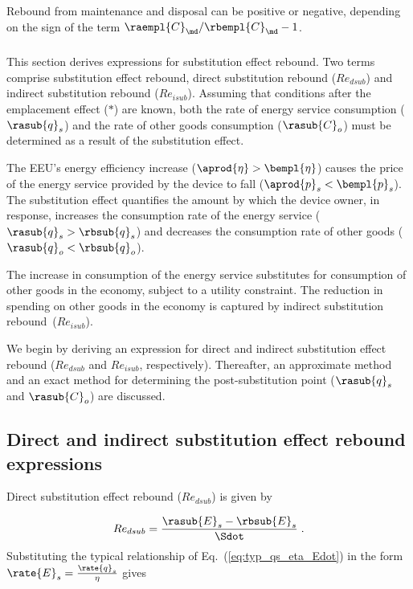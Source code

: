 Rebound from maintenance and disposal can be positive or negative,
depending on the sign of the term $\raempl{C}_{\md}/\rbempl{C}_{\md} - 1$.


\subsubsection{\Subeffect{}} 
\label{sec:Re_sub}

This section derives expressions for substitution effect rebound.
Two terms comprise substitution effect rebound,
direct substitution rebound ($Re_{dsub}$) and
indirect substitution rebound ($Re_{isub}$).
Assuming that conditions after the emplacement effect ($*$) are known, 
both the 
rate of energy service consumption ($\rasub{q}_s$) and
the rate of other goods consumption ($\rasub{C}_o$) 
must be determined as a result of the substitution effect.

The EEU's energy efficiency increase
($\aprod{\eta} > \bempl{\eta}$)
causes the price of the energy service provided by the device to fall
($\aprod{p}_s < \bempl{p}_s$).
The substitution effect quantifies the amount by which
the device owner, in response,
increases the consumption rate of the energy service ($\rasub{q}_s > \rbsub{q}_s$) and
decreases the consumption rate of other goods ($\rasub{q}_o < \rbsub{q}_o$).

The increase in consumption of the energy service 
substitutes for consumption of other goods in the economy,
subject to a utility constraint.
The reduction in spending on other goods in the economy
is captured by indirect substitution rebound~($Re_{isub}$).

We begin by deriving an expression for direct and indirect 
substitution effect rebound ($Re_{dsub}$ and $Re_{isub}$, respectively).
Thereafter, an approximate method and an exact method for determining the 
post-substitution point ($\rasub{q}_s$ and $\rasub{C}_o$)
are discussed.


\subsection{Direct and indirect substitution effect rebound expressions}
\label{sec:Redsub_Reisub_expressions}

Direct substitution effect rebound ($Re_{dsub}$) is given by

\begin{equation}
  Re_{dsub} = \frac{\rasub{E}_s - \rbsub{E}_s}{\Sdot} \; .
\end{equation}
%
Substituting the typical relationship of Eq.~(\ref{eq:typ_qs_eta_Edot})
in the form $\rate{E}_s = \frac{\rate{q}_s}{\eta}$ gives

